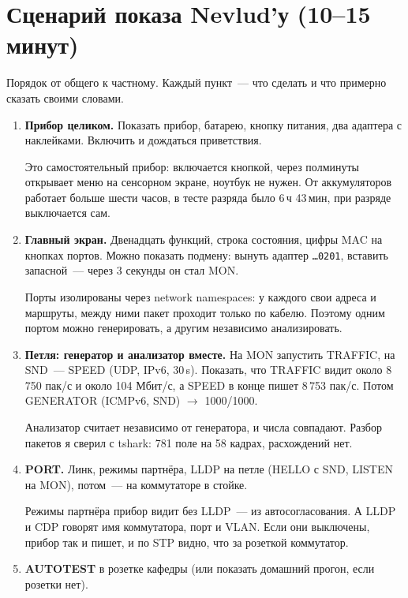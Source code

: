 \documentclass[a4paper,11pt]{article}
\begin{document}
\section{Сценарий показа Nevlud'у (10–15 минут)}

Порядок от общего к частному. Каждый пункт~--- что сделать и что примерно сказать своими словами.

\begin{enumerate}[label=\textbf{\arabic*.},leftmargin=1.6em]
\item \textbf{Прибор целиком.} Показать прибор, батарею, кнопку питания, два адаптера с наклейками.
  Включить и дождаться приветствия.
  \begin{say}
  Это самостоятельный прибор: включается кнопкой, через полминуты открывает меню на сенсорном
  экране, ноутбук не нужен. От аккумуляторов работает больше шести часов, в тесте разряда было 6\,ч
  43\,мин, при разряде выключается сам.
  \end{say}
\item \textbf{Главный экран.} Двенадцать функций, строка состояния, цифры MAC на кнопках портов. Можно
  показать подмену: вынуть адаптер \texttt{…0201}, вставить запасной~--- через 3 секунды он стал MON.
  \begin{say}
  Порты изолированы через network namespaces: у каждого свои адреса и маршруты, между ними пакет
  проходит только по кабелю. Поэтому одним портом можно генерировать, а другим независимо анализировать.
  \end{say}
\item \textbf{Петля: генератор и анализатор вместе.} На MON запустить TRAFFIC, на SND~--- SPEED (UDP,
  IPv6, 30\,s). Показать, что TRAFFIC видит около 8\,750 пак/с и около 104 Мбит/с, а SPEED в конце пишет 8\,753
  пак/с. Потом GENERATOR (ICMPv6, SND) $\rightarrow$ 1000/1000.
  \begin{say}
  Анализатор считает независимо от генератора, и числа совпадают. Разбор пакетов я сверил с tshark:
  781 поле на 58 кадрах, расхождений нет.
  \end{say}
\item \textbf{PORT.} Линк, режимы партнёра, LLDP на петле (HELLO с SND, LISTEN на MON), потом~--- на
  коммутаторе в стойке.
  \begin{say}
  Режимы партнёра прибор видит без LLDP~--- из автосогласования. А LLDP и CDP говорят имя коммутатора,
  порт и VLAN. Если они выключены, прибор так и пишет, и по STP видно, что за розеткой коммутатор.
  \end{say}
\item \textbf{AUTOTEST} в розетке кафедры (или показать домашний прогон, если розетки нет).

\end{enumerate}
\end{document}
